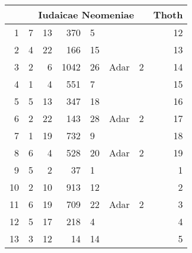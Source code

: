%
\begin{tabnums} %
\footnotesize
\centering
\renewcommand{\arraystretch}{1.0265} %
%
\newcommand{\cwd}{3.2em}
\newcommand{\da}{{\tiny †}}
\newcommand{\db}{{\scriptsize o}}
\newcommand{\ang}{90}
\newcommand{\hsb}[1]{\footnotesize{#1}}
\newcommand{\hsa}[1]{\scriptsize{#1}}
\newcommand{\hsp}[1]{\tiny{#1}}
%
\newcommand{\hdrA}{%
  ~ &
  \multicolumn{6}{c}{\hsa{Iudaicae Neomeniae}} &
  \multicolumn{1}{c}{\hsa{Thoth}}
}
%
\newcommand{\hdrs}{%
\hdrA \\
\cmidrule(r){1-1} \cmidrule(lr){2-4}
\cmidrule(lr){5-7} \cmidrule(l){8-8}
}
%
\begin{tabular}[c]{@{} r lrr lll r @{}}
\toprule
\hdrs %
\midrule
 1 & 7 & 13 &  370 &  5 &      &   & 12 \\
 2 & 4 & 22 &  166 & 15 &      &   & 13 \\
 3 & 2 &  6 & 1042 & 26 & Adar & 2 & 14 \\
 4 & 1 &  4 &  551 &  7 &      &   & 15 \\
 5 & 5 & 13 &  347 & 18 &      &   & 16 \\
 6 & 2 & 22 &  143 & 28 & Adar & 2 & 17 \\
 7 & 1 & 19 &  732 &  9 &      &   & 18 \\
 8 & 6 &  4 &  528 & 20 & Adar & 2 & 19 \\
 9 & 5 &  2 &   37 &  1 &      &   &  1 \\
10 & 2 & 10 &  913 & 12 &      &   &  2 \\
11 & 6 & 19 &  709 & 22 & Adar & 2 &  3 \\
12 & 5 & 17 &  218 &  4 &      &   &  4 \\
13 & 3 & 12 &   14 & 14 &      &   &  5 \\

\end{tabular}
\end{tabnums}
